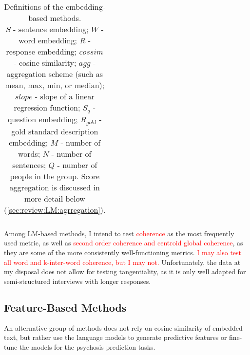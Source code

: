 \begin{table}[]
{\begin{tabular}{lll}
\end{tabular}}
\captionsetup{width=\textwidth}
\caption[Definitions of the embedding-based methods]{\label{tab:def:LM} Definitions of the embedding-based methods. \\
$S$ - sentence embedding; $W$ - word embedding; $R$ - response embedding; $cossim$ - cosine similarity; $agg$ - aggregation scheme (such as mean, max, min, or median); $slope$ - slope of a linear regression function; $S_q$ - question embedding; $R_{gold}$ - gold standard description embedding; $M$ - number of words; $N$ - number of sentences; $Q$ - number of people in the group. Score aggregation is discussed in more detail below (\ref{sec:review:LM:agrregation}).}
\end{table}

Among LM-based methods, I intend to test \textcolor{red}{coherence} as the most frequently used metric, as well as \textcolor{red}{second order coherence and centroid global coherence}, as they are some of the more consistently well-functioning metrics. \textcolor{red}{I may also test all word and k-inter-word coherence, but I may not.} Unfortunately, the data at my disposal does not allow for testing tangentiality, as it is only well adapted for semi-structured interviews with longer responses.

\subsection{Feature-Based Methods}
\label{sec:review:LM:features}
An alternative group of methods does not rely on cosine similarity of embedded text, but rather use the language models to generate predictive features or fine-tune the models for the psychosis prediction tasks.

